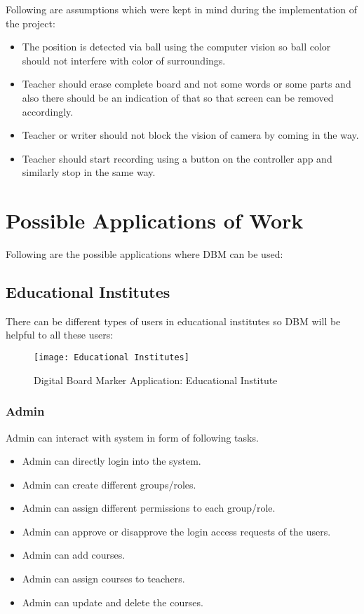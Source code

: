 Following are assumptions which were kept in mind during the implementation of the project:

\begin{itemize}

\item The position is detected via ball using the computer vision so ball color should not interfere with color of surroundings.

\item Teacher should erase complete board and not some words or some parts and also there should be an indication of that so that screen can be removed accordingly.

\item Teacher or writer should not block the vision of camera by coming in the way.

\item Teacher should start recording using a button on the controller app and similarly stop in the same way.

\end{itemize}
\bigskip


\section{Possible Applications of Work}
Following are the possible applications where DBM can be used:
\bigskip

\subsection{Educational Institutes}
There can be different types of users in educational institutes so DBM will be helpful to all these users:
\bigskip

\begin{figure}[h]
  \centering
  \texttt{[image: Educational Institutes]}
  \caption{Digital Board Marker Application: Educational Institute}
\end{figure}

\bigskip
\subsubsection{Admin}
Admin can interact with system in form of following tasks.
\begin{itemize}
\item Admin can directly login into the system.
\item Admin can create different groups/roles.
\item Admin can assign different permissions to each group/role.
\item Admin can approve or disapprove the login access requests of the users.
\item Admin can add courses.
\item Admin can assign courses to teachers.
\item Admin can update and delete the courses.
\end{itemize}
\bigskip


